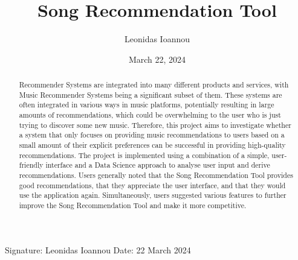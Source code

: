 \documentclass{l4proj}
\begin{document}
\title{Song Recommendation Tool}
\author{Leonidas Ioannou}
\date{March 22, 2024}

\maketitle

\begin{abstract}
    Recommender Systems are integrated into many different products and services, with Music Recommender Systems being a significant subset of them. These systems are often integrated in various ways in music platforms, potentially resulting in large amounts of recommendations, which could be overwhelming to the user who is just trying to discover some new music. Therefore, this project aims to investigate whether a system that only focuses on providing music recommendations to users based on a small amount of their explicit preferences can be successful in providing high-quality recommendations. The project is implemented using a combination of a simple, user-friendly interface and a Data Science approach to analyse user input and derive recommendations. Users generally noted that the Song Recommendation Tool provides good recommendations, that they appreciate the user interface, and that they would use the application again. Simultaneously, users suggested various features to further improve the Song Recommendation Tool and make it more competitive. 
\end{abstract}


%
%
%
\educationalconsent

Signature: Leonidas Ioannou \space \space Date: 22 March 2024
\tableofcontents
\end{document}
